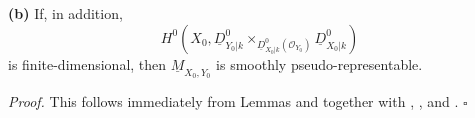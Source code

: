 \smallskip
\noindent\textbf{(b)}
If, in addition,
\[
H^0\!\left(
X_0,
\underline D^0_{Y_0|k}
\times_{\underline D^0_{X_0|k}(\mathcal O_{Y_0})}
\underline D^0_{X_0|k}
\right)
\]
is finite-dimensional, then $\underline M_{X_0,Y_0}$ is smoothly
pseudo-representable.

\medskip
\noindent\textit{Proof.}
This follows immediately from Lemmas  and  together with ,
, and . \hfill$\square$
